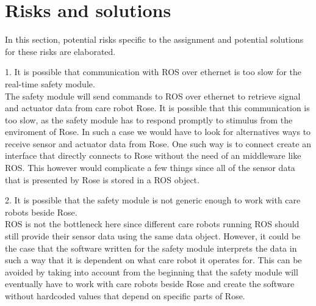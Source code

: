 \documentclass[12pt]{scrreprt}
\begin{document}
\section{Risks and solutions}
\label{Risks and solutions}


In this section, potential risks specific to the assignment and potential solutions for these risks are elaborated.

\begin{description}
\item 1. It is possible that communication with ROS over ethernet is too slow for the real-time safety module.\\
    The safety module will send commands to ROS over ethernet to retrieve signal and actuator data from care robot Rose. It is possible that this communication is too slow, as the safety module has to respond promptly to stimulus from the enviroment of Rose. In such a case we would have to look for alternatives ways to receive sensor and actuator data from Rose. One such way is to connect create an interface that directly connects to Rose without the need of an middleware like ROS. This however would complicate a few things since all of the sensor data that is presented by Rose is stored in a ROS object.
\item 2. It is possible that the safety module is not generic enough to work with care robots beside Rose.\\
    ROS is not the bottleneck here since different care robots running ROS should still provide their sensor data using the same data object. However, it could be the case that the software written for the safety module interprets the data in such a way that it is dependent on what care robot it operates for. This can be avoided by taking into account from the beginning that the safety module will eventually have to work with care robots beside Rose and create the software without hardcoded values that depend on specific parts of Rose.
\end{description}
\end{document}
